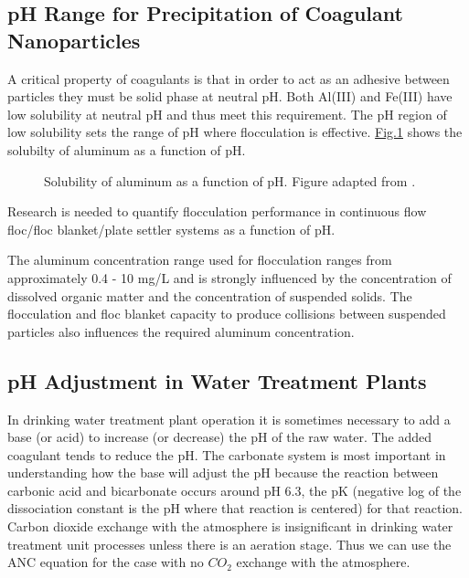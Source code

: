 \documentclass[letterpaper,10pt,english]{sphinxmanual}
\let\sphinxpxdimen\pdfpxdimen\else\newdimen\sphinxpxdimen
\begin{document}
\subsection{pH Range for Precipitation of Coagulant Nanoparticles}
\label{\detokenize{Rapid_Mix/RM_Intro:ph-range-for-precipitation-of-coagulant-nanoparticles}}\label{\detokenize{Rapid_Mix/RM_Intro:heading-ph-range-for-precipitation-of-coagulant-nanoparticles}}
A critical property of coagulants is that in order to act as an adhesive between particles they must be solid phase at neutral pH. Both Al(III) and Fe(III) have low solubility at neutral pH and thus meet this requirement. The pH region of low solubility sets the range of pH where flocculation is effective. \hyperref[\detokenize{Rapid_Mix/RM_Intro:figure-al-solubility}]{Fig.\@ \ref{\detokenize{Rapid_Mix/RM_Intro:figure-al-solubility}}} shows the solubilty of aluminum as a function of pH.

\begin{figure}[htbp]
\centering
\capstart

\noindent\sphinxincludegraphics[width=600\sphinxpxdimen]{{Al_solubility}.png}
\caption{Solubility of aluminum as a function of pH. Figure adapted from .}\label{\detokenize{Rapid_Mix/RM_Intro:id4}}\label{\detokenize{Rapid_Mix/RM_Intro:figure-al-solubility}}\end{figure}

Research is needed to quantify flocculation performance in continuous flow floc/floc blanket/plate settler systems as a function of pH.

The aluminum concentration range used for flocculation ranges from approximately 0.4 - 10 mg/L and is strongly influenced by the concentration of dissolved organic matter and the concentration of suspended solids. The flocculation and floc blanket capacity to produce collisions between suspended particles also influences the required aluminum concentration.


\subsection{pH Adjustment in Water Treatment Plants}
\label{\detokenize{Rapid_Mix/RM_Intro:ph-adjustment-in-water-treatment-plants}}\label{\detokenize{Rapid_Mix/RM_Intro:heading-ph-adjustment-in-water-treatment-plants}}
In drinking water treatment plant operation it is sometimes necessary to add a base (or acid) to increase (or decrease) the pH of the raw water. The added coagulant tends to reduce the pH. The carbonate system is most important in understanding how the base will adjust the pH because the reaction between carbonic acid and bicarbonate occurs around pH 6.3, the pK (negative log of the dissociation constant is the pH where that reaction is centered) for that reaction. Carbon dioxide exchange with the atmosphere is insignificant in drinking water treatment unit processes unless there is an aeration stage. Thus we can use the ANC equation for the case with no \(CO_2\) exchange with the atmosphere.
\end{document}
